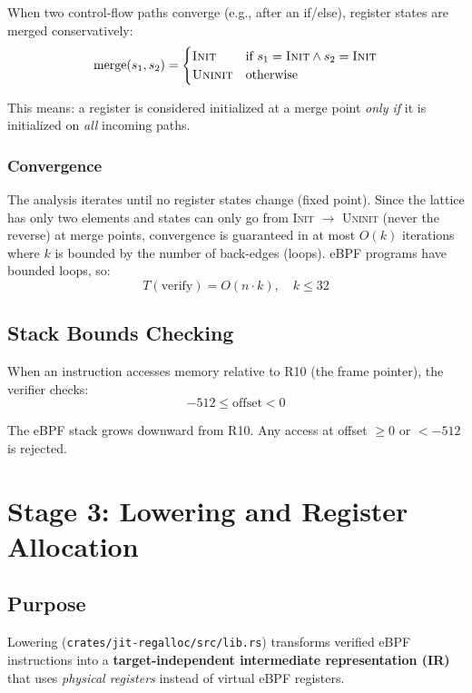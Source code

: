 \documentclass[11pt,letterpaper]{article}
\begin{document}
When two control-flow paths converge (e.g., after an if/else), register states are merged conservatively:
\[
\text{merge}(s_1, s_2) = \begin{cases} \textsc{Init} & \text{if } s_1 = \textsc{Init} \wedge s_2 = \textsc{Init} \\ \textsc{Uninit} & \text{otherwise} \end{cases}
\]

This means: a register is considered initialized at a merge point \emph{only if} it is initialized on \emph{all} incoming paths.

\subsubsection{Convergence}

The analysis iterates until no register states change (fixed point). Since the lattice has only two elements and states can only go from \textsc{Init} $\to$ \textsc{Uninit} (never the reverse) at merge points, convergence is guaranteed in at most $O(k)$ iterations where $k$ is bounded by the number of back-edges (loops). eBPF programs have bounded loops, so:
\[
T(\text{verify}) = O(n \cdot k), \quad k \leq 32
\]

\subsection{Stack Bounds Checking}

When an instruction accesses memory relative to R10 (the frame pointer), the verifier checks:
\[
-512 \leq \text{offset} < 0
\]

The eBPF stack grows downward from R10. Any access at offset $\geq 0$ or $< -512$ is rejected.

\section{Stage 3: Lowering and Register Allocation}
\label{sec:regalloc}

\subsection{Purpose}

Lowering (\texttt{crates/jit-regalloc/src/lib.rs}) transforms verified eBPF instructions into a \textbf{target-independent intermediate representation (IR)} that uses \emph{physical registers} instead of virtual eBPF registers.
\end{document}
